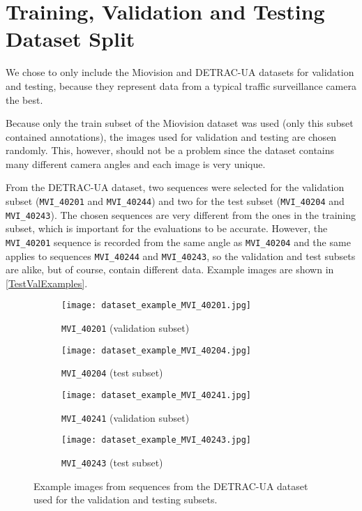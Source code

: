 \section{Training, Validation and Testing Dataset Split}

We chose to only include the Miovision and DETRAC-UA datasets for validation and
testing, because they represent data from a typical traffic surveillance camera
the best. 

Because only the train subset of the Miovision dataset was used (only this
subset contained annotations), the images used for validation and testing are
chosen randomly. This, however, should not be a problem since the dataset
contains many different camera angles and each image is very unique.

From the DETRAC-UA dataset, two sequences were selected for the validation
subset (\texttt{MVI\_40201} and \texttt{MVI\_40244}) and two for the test subset
(\texttt{MVI\_40204} and \texttt{MVI\_40243}). The chosen sequences are very
different from the ones in the training subset, which is important for the
evaluations to be accurate. However, the \texttt{MVI\_40201} sequence is
recorded from the same angle as \texttt{MVI\_40204} and the same applies to
sequences \texttt{MVI\_40244} and \texttt{MVI\_40243}, so the validation and
test subsets are alike, but of course, contain different data. Example images
are shown in \autoref{TestValExamples}.

\begin{figure}
    \centering
    \begin{subfigure}[b]{0.475\textwidth}
        \texttt{[image: dataset\_example\_MVI\_40201.jpg]}
        \caption{\texttt{MVI\_40201} (validation subset)}
    \end{subfigure}
    \begin{subfigure}[b]{0.475\textwidth}
        \texttt{[image: dataset\_example\_MVI\_40204.jpg]}
        \caption{\texttt{MVI\_40204} (test subset)}
    \end{subfigure}
    \begin{subfigure}[b]{0.475\textwidth}
        \texttt{[image: dataset\_example\_MVI\_40241.jpg]}
        \caption{\texttt{MVI\_40241} (validation subset)}
    \end{subfigure}
    \begin{subfigure}[b]{0.475\textwidth}
        \texttt{[image: dataset\_example\_MVI\_40243.jpg]}
        \caption{\texttt{MVI\_40243} (test subset)}
    \end{subfigure}
    \caption{Example images from sequences from the DETRAC-UA dataset used for
    the validation and testing subsets.}
    \label{TestValExamples}
\end{figure}

